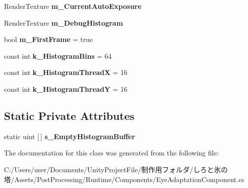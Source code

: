 \begin{DoxyCompactItemize}
Render\+Texture {\bfseries m\+\_\+\+Current\+Auto\+Exposure}
\item 
\mbox{\label{class_unity_engine_1_1_post_processing_1_1_eye_adaptation_component_ad6f36fd3106cd9e3f73e300831008647}} 
Render\+Texture {\bfseries m\+\_\+\+Debug\+Histogram}
\item 
\mbox{\label{class_unity_engine_1_1_post_processing_1_1_eye_adaptation_component_a8ce4218bc24063d4507c7c625ba0b7b6}} 
bool {\bfseries m\+\_\+\+First\+Frame} = true
\item 
\mbox{\label{class_unity_engine_1_1_post_processing_1_1_eye_adaptation_component_ab06dfc1c0abafdaa137671c1c5f86259}} 
const int {\bfseries k\+\_\+\+Histogram\+Bins} = 64
\item 
\mbox{\label{class_unity_engine_1_1_post_processing_1_1_eye_adaptation_component_aeaaeef3111b5b1a3d12fe213ace0a82e}} 
const int {\bfseries k\+\_\+\+Histogram\+ThreadX} = 16
\item 
\mbox{\label{class_unity_engine_1_1_post_processing_1_1_eye_adaptation_component_af9a3876cd982aff783dff0ee698bf8d4}} 
const int {\bfseries k\+\_\+\+Histogram\+ThreadY} = 16
\end{DoxyCompactItemize}
\subsection*{Static Private Attributes}
\begin{DoxyCompactItemize}
\item 
\mbox{\label{class_unity_engine_1_1_post_processing_1_1_eye_adaptation_component_a791d1da1d068ae9be19f47c28dbcf52a}} 
static uint \mbox{[}$\,$\mbox{]} {\bfseries s\+\_\+\+Empty\+Histogram\+Buffer}
\end{DoxyCompactItemize}


The documentation for this class was generated from the following file\+:\begin{DoxyCompactItemize}
\item 
C\+:/\+Users/user/\+Documents/\+Unity\+Project\+File/制作用フォルダ/しろと氷の塔/\+Assets/\+Post\+Processing/\+Runtime/\+Components/Eye\+Adaptation\+Component.\+cs\end{DoxyCompactItemize}
